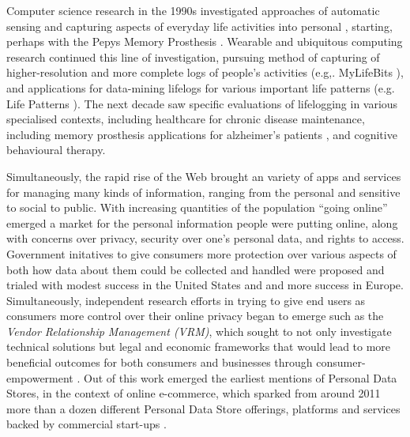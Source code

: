 \documentclass[runningheads,a4paper]{llncs}
\begin{document}
Computer science research in the 1990s investigated approaches of automatic sensing and capturing aspects of everyday life activities into personal \cite{lifelogs}, starting, perhaps with the Pepys Memory Prosthesis \cite{pepys}.  Wearable and ubiquitous computing research continued this line of investigation, pursuing method of capturing of higher-resolution and more complete logs of people's activities (e.g,. MyLifeBits \cite{mylifebits}), and applications for data-mining lifelogs for various important life patterns (e.g. Life Patterns \cite{clarksonphd}).  The next decade saw specific evaluations of lifelogging in various specialised contexts, including healthcare for chronic disease maintenance, including memory prosthesis applications for alzheimer's patients \cite{}, and cognitive behavioural therapy.

Simultaneously, the rapid rise of the Web brought an variety of apps and services for managing many kinds of information, ranging from the personal and sensitive to social to public.  With increasing quantities of the population ``going online'' emerged a market for the personal information people were putting online, along with concerns over privacy, security over one's personal data, and rights to access. Government initatives to give consumers more protection over various aspects of both how data about them could be collected and handled were proposed and trialed with modest success in the United States and and more success in Europe.  Simultaneously, independent research efforts in trying to give end users as consumers more control over their online privacy began to emerge such as the \emph{Vendor Relationship Management (VRM)}, which sought to not only investigate technical solutions but legal and economic frameworks that would lead to more beneficial outcomes for both consumers and businesses through consumer-empowerment \cite{vrm}.  Out of this work emerged the earliest mentions of Personal Data Stores, in the context of online e-commerce, which sparked from around 2011 more than a dozen different Personal Data Store offerings, platforms and services backed by commercial start-ups \cite{ctrlshift-report}. 
\end{document}
